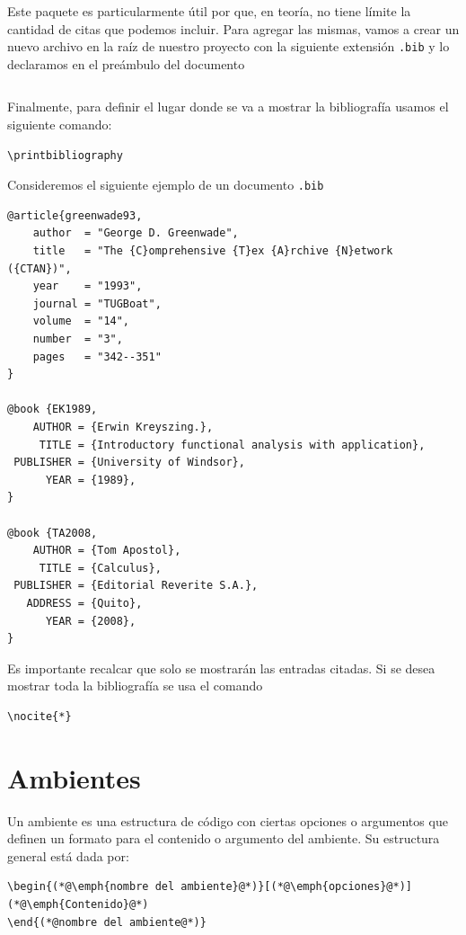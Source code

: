 \documentclass[a4,10pt]{aleph-notas}
\begin{document}
Este paquete es particularmente útil por que, en teoría, no tiene límite la cantidad de citas que podemos incluir. Para agregar las mismas, vamos a crear un nuevo archivo en la raíz de nuestro proyecto con la siguiente extensión \texttt{.bib} y lo declaramos en el preámbulo del documento

\begin{lstlisting}[frame=single]

\end{lstlisting}

Finalmente, para definir el lugar donde se va a mostrar la bibliografía usamos el siguiente comando:

\begin{lstlisting}[frame=single]
\printbibliography
\end{lstlisting}

Consideremos el siguiente ejemplo de un documento \texttt{.bib}


\begin{lstlisting}[frame=single]
@article{greenwade93,
    author  = "George D. Greenwade",
    title   = "The {C}omprehensive {T}ex {A}rchive {N}etwork ({CTAN})",
    year    = "1993",
    journal = "TUGBoat",
    volume  = "14",
    number  = "3",
    pages   = "342--351"
}

@book {EK1989,
    AUTHOR = {Erwin Kreyszing.},
     TITLE = {Introductory functional analysis with application},
 PUBLISHER = {University of Windsor},
      YEAR = {1989},
}

@book {TA2008,
    AUTHOR = {Tom Apostol},
     TITLE = {Calculus},
 PUBLISHER = {Editorial Reverite S.A.},
   ADDRESS = {Quito},
      YEAR = {2008},
}
\end{lstlisting}

{\color{red} Es importante recalcar que solo se mostrarán las entradas citadas.} Si se desea mostrar toda la bibliografía se usa el comando

\begin{lstlisting}[frame=single]
\nocite{*}
\end{lstlisting}

\nocite{*}
\printbibliography


\section{Ambientes}

Un ambiente es una estructura de código con ciertas opciones o argumentos que definen un formato para el contenido o argumento del ambiente. Su estructura general está dada por:
\begin{lstlisting}[frame=single]
\begin{(*@\emph{nombre del ambiente}@*)}[(*@\emph{opciones}@*)]
(*@\emph{Contenido}@*)
\end{(*@nombre del ambiente@*)}
\end{lstlisting}
\end{document}

